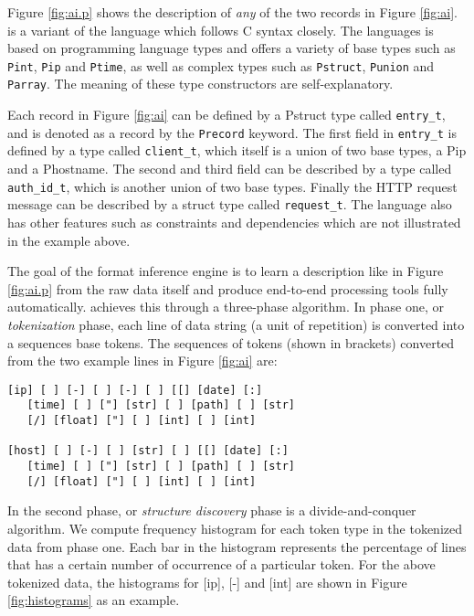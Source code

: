 Figure \ref{fig:ai.p} shows the \padsc {} description of {\em any}
of the two records in Figure \ref{fig:ai}. \padsc{} is a variant of the
\pads{} language which follows C syntax closely. 
The \pads{} languages is based on programming language types and
offers a variety of base types such as {\tt Pint}, {\tt Pip} and {\tt Ptime}, 
as well as complex types such as {\tt Pstruct}, {\tt Punion} and {\tt Parray}. 
The meaning of these type constructors are self-explanatory.

Each record in Figure \ref{fig:ai} can be defined by a Pstruct type called \verb#entry_t#, 
and is denoted as a record by the {\tt Precord} keyword. 
The first field in \verb#entry_t# is defined by a type called 
\verb#client_t#, which itself is a union of two base types, a Pip and
a Phostname. The second and third field can be described by a type
called \verb#auth_id_t#, which is another union of two base types.
Finally the HTTP request message can be described by a struct type
called \verb#request_t#. The \pads{} language also has other features
such as constraints and dependencies which are not illustrated in the example
above. 

The goal of the \learnpads{} format inference engine is to 
learn a \pads{} description like in Figure \ref{fig:ai.p} from
the raw data itself and produce end-to-end processing tools fully
automatically. \learnpads{} achieves this through a three-phase algorithm.
In phase one, or {\em tokenization} phase, each line of data string (a unit of
repetition) is converted into a sequences base tokens. The sequences of
tokens (shown in brackets) converted from the two example lines 
in Figure \ref{fig:ai} are:

{\small
\begin{verbatim}
[ip] [ ] [-] [ ] [-] [ ] [[] [date] [:] 
   [time] [ ] ["] [str] [ ] [path] [ ] [str] 
   [/] [float] ["] [ ] [int] [ ] [int]

[host] [ ] [-] [ ] [str] [ ] [[] [date] [:] 
   [time] [ ] ["] [str] [ ] [path] [ ] [str] 
   [/] [float] ["] [ ] [int] [ ] [int]
\end{verbatim}
}

In the second phase, or {\em structure discovery} phase is
a divide-and-conquer algorithm. 
We compute frequency histogram for each token type in the
tokenized data from phase one. Each bar in the histogram represents
the percentage of lines that has a certain number of occurrence of
a particular token. For the above tokenized data, the histograms for 
[ip], [-] and [int] are shown in Figure \ref{fig:histograms} as an example.

